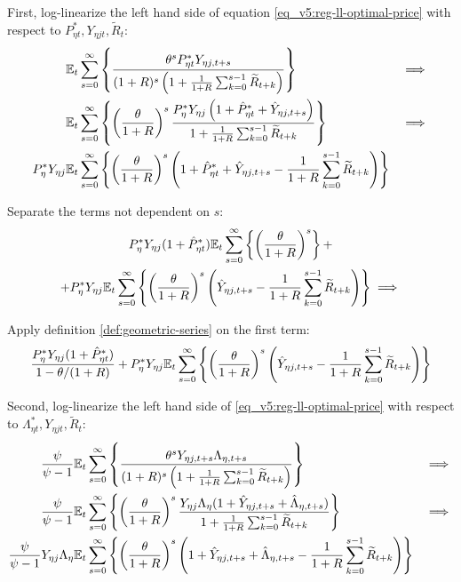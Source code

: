 \documentclass[../thesis.tex]{subfiles}
\begin{document}
First, log-linearize the left hand side of equation \ref{eq_v5:reg-ll-optimal-price} with respect to \( P_{\eta t}^{\ast}, Y_{\eta j t}, \widetilde{R}_t \):
\begin{alignat}{2}
	& {\mathbb{E}_{t}} \sum_{s=0}^{\infty} \left\{ \frac{\theta^s P_{\eta t}^{\ast} Y_{\eta j,t+s}}{ (1 + R)^s \left( 1 + \frac{1}{1 + R} \sum_{k=0}^{s-1} \widetilde{R}_{t+k} \right)} \right\} &\implies \nonumber \\
	& {\mathbb{E}_{t}} \sum_{s=0}^{\infty} \left\{ \left( \frac{\theta}{1 + R} \right)^s  \frac{ P_{\eta}^{\ast} Y_{\eta j} \left( 1 + \hat{P}_{\eta t}^{\ast} + \hat{Y}_{\eta j, t+s} \right)}{ 1 + \frac{1}{1 + R} \sum_{k=0}^{s-1} \widetilde{R}_{t+k}} \right\} &\implies \nonumber \\
	P_{\eta}^{\ast} Y_{\eta j} &{\mathbb{E}_{t}} \sum_{s=0}^{\infty} \left\{ \left( \frac{\theta}{1 + R} \right)^s \left( 1 + \hat{P}_{\eta t}^{\ast} + \hat{Y}_{\eta j, t+s} - \frac{1}{1 + R} \sum_{k=0}^{s-1} \widetilde{R}_{t+k} \right) \right\} & \nonumber
\end{alignat}

Separate the terms not dependent on $s$:
\begin{multline}
	P_{\eta}^{\ast} Y_{\eta j} ( 1 + \hat{P}_{\eta t}^{\ast} ) {\mathbb{E}_{t}} \sum_{s=0}^{\infty} \left\{ \left( \frac{\theta}{1 + R} \right)^s \right\} + \\
	+ P_{\eta}^{\ast} Y_{\eta j} {\mathbb{E}_{t}} \sum_{s=0}^{\infty} \left\{ \left( \frac{\theta}{1 + R} \right)^s \left( \hat{Y}_{\eta j, t+s} - \frac{1}{1 + R} \sum_{k=0}^{s-1} \widetilde{R}_{t+k} \right) \right\} \implies \nonumber
\end{multline}

Apply definition \ref{def:geometric-series} on the first term:
\begin{align}
	\frac{ P_{\eta}^{\ast} Y_{\eta j} ( 1 + \hat{P}_{\eta t}^{\ast} )}{1-\theta /(1+R)} + P_{\eta}^{\ast} Y_{\eta j} {\mathbb{E}_{t}} \sum_{s=0}^{\infty} \left\{ \left( \frac{\theta}{1 + R} \right)^s \left( \hat{Y}_{\eta j, t+s} - \frac{1}{1 + R} \sum_{k=0}^{s-1} \widetilde{R}_{t+k} \right) \right\} \nonumber
\end{align}

Second, log-linearize the left hand side of \ref{eq_v5:reg-ll-optimal-price} with respect to \( \Lambda_{\eta t}^{\ast}, Y_{\eta j t}, \widetilde{R}_t \):
\begin{alignat}{2}
	\frac{\psi}{\psi-1} &{\mathbb{E}_{t}} \sum_{s=0}^{\infty} \left\{ \frac{\theta^s Y_{\eta j,t+s} \Lambda_{\eta, t+s}}{ (1 + R)^s \left( 1 + \frac{1}{1 + R} \sum_{k=0}^{s-1} \widetilde{R}_{t+k} \right)} \right\} & \implies \nonumber \\
	\frac{\psi}{\psi-1} &{\mathbb{E}_{t}} \sum_{s=0}^{\infty} \left\{ \left( \frac{\theta}{1 + R} \right)^s \frac{ Y_{\eta j} \Lambda_{\eta} (1+ \hat{Y}_{\eta j, t+s} + \hat{\Lambda}_{\eta, t+s})}{ 1 + \frac{1}{1 + R} \sum_{k=0}^{s-1} \widetilde{R}_{t+k}} \right\} & \implies \nonumber \\
	\frac{\psi}{\psi-1} Y_{\eta j} \Lambda_{\eta} &{\mathbb{E}_{t}} \sum_{s=0}^{\infty} \left\{ \left( \frac{\theta}{1 + R} \right)^s \left( 1+ \hat{Y}_{\eta j, t+s} + \hat{\Lambda}_{\eta, t+s} - \frac{1}{1 + R} \sum_{k=0}^{s-1} \widetilde{R}_{t+k} \right) \right\} & \nonumber
\end{alignat}
\end{document}
